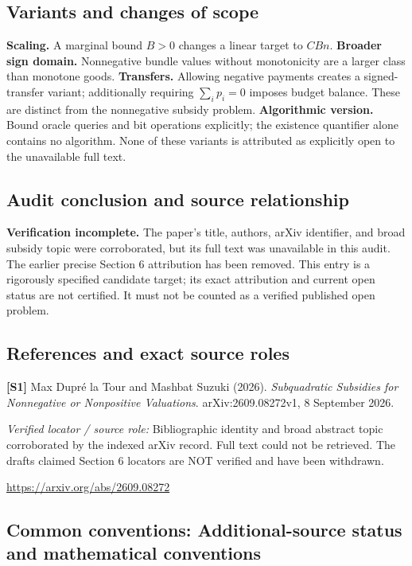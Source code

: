 \documentclass[11pt,a4paper]{article}
\begin{document}
\subsection*{Variants and changes of scope}

\textbf{Scaling.} A marginal bound $B>0$ changes a linear target to $CBn$. \textbf{Broader sign domain.} Nonnegative bundle values without monotonicity are a larger class than monotone goods. \textbf{Transfers.} Allowing negative payments creates a signed-transfer variant; additionally requiring $\sum_i p_i=0$ imposes budget balance. These are distinct from the nonnegative subsidy problem. \textbf{Algorithmic version.} Bound oracle queries and bit operations explicitly; the existence quantifier alone contains no algorithm. None of these variants is attributed as explicitly open to the unavailable full text.

\subsection*{Audit conclusion and source relationship}

\textbf{Verification incomplete.} The paper's title, authors, arXiv identifier, and broad subsidy topic were corroborated, but its full text was unavailable in this audit. The earlier precise Section 6 attribution has been removed. This entry is a rigorously specified candidate target; its exact attribution and current open status are not certified. It must not be counted as a verified published open problem.

\subsection*{References and exact source roles}

{\footnotesize\raggedright
\par\noindent\textbf{[S1]} Max Dupr\'e la Tour and Mashbat Suzuki (2026). \emph{Subquadratic Subsidies for Nonnegative or Nonpositive Valuations}. arXiv:2609.08272v1, 8 September 2026.\par \textit{Verified locator / source role:} Bibliographic identity and broad abstract topic corroborated by the indexed arXiv record. Full text could not be retrieved. The draft\textquotesingle s claimed Section 6 locators are NOT verified and have been withdrawn.\par \url{https://arxiv.org/abs/2609.08272}\par\smallskip
}

\subsection*{Common conventions: Additional-source status and mathematical conventions}
\end{document}

